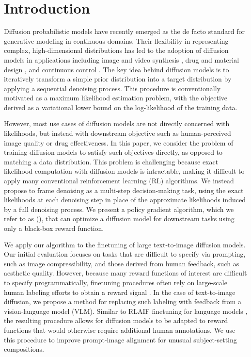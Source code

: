 \section{Introduction}
\label{sec:intro}

Diffusion probabilistic models \citep{sohldickstein2015nonequilibrium} have recently emerged as the de facto standard for generative modeling in continuous domains.
Their flexibility in representing complex, high-dimensional distributions has led to the adoption of diffusion models in applications including image and video synthesis \citep{ramesh2021dalle,saharia2022imagen,ho2022imagenvideo}, drug and material design \citep{xu2021geodiff,xie2021crystal,schneuing2022structure}, and continuous control \citep{janner2022diffuser,wang2022dql,hansenestruch2023idql}.
The key idea behind diffusion models is to iteratively transform a simple prior distribution into a target distribution by applying a sequential denoising process.
This procedure is conventionally motivated as a maximum likelihood estimation problem, with the objective derived as a variational lower bound on the log-likelihood of the training data.

However, most use cases of diffusion models are not directly concerned with likelihoods, but instead with downstream objective such as human-perceived image quality or drug effectiveness.
In this paper, we consider the problem of training diffusion models to satisfy such objectives directly, as opposed to matching a data distribution.
This problem is challenging because exact likelihood computation with diffusion models is intractable, making it difficult to apply many conventional reinforcement learning (RL) algorithms.
We instead propose to frame denoising as a multi-step decision-making task, using the exact likelihoods at each denoising step in place of the approximate likelihoods induced by a full denoising process.
We present a policy gradient algorithm, which we refer to as \methodfull{} (\methodours{}), that can optimize a diffusion model for downstream tasks using only a black-box reward function.

We apply our algorithm to the finetuning of large text-to-image diffusion models.
Our initial evaluation focuses on tasks that are difficult to specify via prompting, such as image compressibility, and those derived from human feedback, such as aesthetic quality.
However, because many reward functions of interest are difficult to specify programmatically, finetuning procedures often rely on large-scale human labeling efforts to obtain a reward signal \citep{ouyang2022instructgpt}.
In the case of text-to-image diffusion, we propose a method for replacing such labeling with feedback from a vision-language model (VLM).
Similar to RLAIF finetuning for language models \citep{bai2022constitutional}, the resulting procedure allows for diffusion models to be adapted to reward functions that would otherwise require additional human annotations.
We use this procedure to improve prompt-image alignment for unusual subject-setting compositions.

